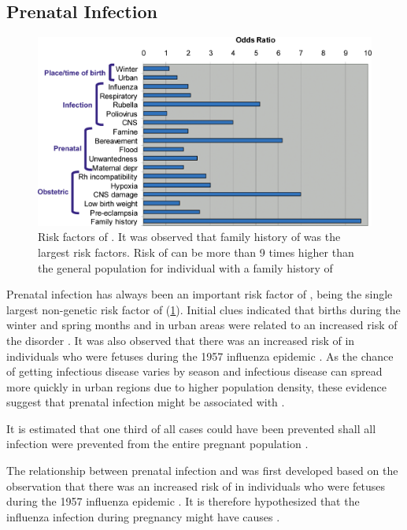 	\subsection{Prenatal Infection}
	\begin{figure}
		\centering
		\includegraphics[width=\textwidth]{figure/risk_factors_of_schizophrenia.png}
		\caption[Risk factors of ]{Risk factors of .
			It was observed that family history of  was the largest risk factors.
			Risk of  can be more than 9 times higher than the general population for individual with a family history of }
		\label{fig:riskfactors}
	\end{figure}
	Prenatal infection has always been an important risk factor of , being the single largest non-genetic risk factor of  (\cref{fig:riskfactors})\citep{Sullivan2005}.
	Initial clues indicated that births during the winter and spring months and in urban areas were related to an increased risk of the disorder \citep{Brown2010}.
	It was also observed that there was an increased risk of  in individuals who were fetuses during the 1957 influenza epidemic \citep{Mednick1958}.
	As the chance of getting infectious disease varies by season and infectious disease can spread more quickly in urban regions due to higher population density, these evidence suggest that prenatal infection might be associated with .
	
	
	
	It is estimated that one third of all  cases could have been prevented shall all infection were prevented from the entire pregnant population \citep{Brown2010}.
	
	The relationship between prenatal infection and  was first developed based on the observation that there was an increased risk of  in individuals who were fetuses during the 1957 influenza epidemic \citep{Mednick1958}. 
	It is therefore hypothesized that the influenza infection during pregnancy might have causes .
	
